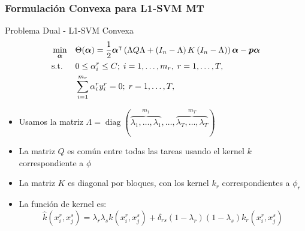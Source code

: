 \documentclass[aspectratio=43]{beamer}
\DeclareMathOperator{\Diag}{diag}
\newcommand{\upper}[1]{\expandafter\MakeUppercase\expandafter{#1}}
\newcommand{\mymat}[1]{\upper{#1}}
\newcommand{\myvec}[1]{\bm{#1}}
\newcommand{\fv}[1]{\myvec{#1}}
\newcommand{\fm}[1]{\mymat{#1}}
\newcommand{\nsamples}{n}
\newcommand{\ntasks}{T}
\newcommand{\npertask}{m}
\begin{document}
  \begin{frame}
      \frametitle{Formulación Convexa para L1-SVM MT}
  
      \begin{block}{Problema Dual - L1-SVM Convexa}
            \begin{equation}\nonumber
                  \begin{aligned}
                  & \min_{\fv{\alpha}} && \Theta(\fv{\alpha}) = \frac{1}{2} \fv{\alpha}^\intercal \left(\Lambda \fm{Q} \Lambda + \left(\fm{I}_{\nsamples} - \Lambda \right) \fm{K} \left(\fm{I}_{\nsamples} - \Lambda \right) \right) \fv{\alpha} - \fv{p} \fv{\alpha} \\
                  & \text{s.t.}
                  & & 0 \leq \alpha_i^r \leq C ; \; i=1, \ldots, \npertask_r,\; r=1, \ldots, \ntasks ,\\
                  & & & \sum_{i=1}^{m_r} \alpha_i^r y_i^r = 0;\;  r=1, \ldots, \ntasks , \\
                  \end{aligned}
              \end{equation}
      \end{block}
      \begin{itemize}
            \item Usamos la matriz $  \Lambda = \Diag(\overbrace{\lambda_1, \ldots, \lambda_1}^{\npertask_1}, \ldots, \overbrace{\lambda_\ntasks, \ldots, \lambda_\ntasks}^{\npertask_\ntasks}) $
            \item La matriz $Q$ es común entre todas las tareas usando el kernel $k$ correspondiente a $\phi$
            \item La matriz $K$ es diagonal por bloques, con los kernel $k_r$ correspondientes a $\phi_r$
            \item La función de kernel es: 
            $$     \widehat{k}({x}_i^r, {x}_j^s) = \lambda_r \lambda_s k({x}_i^r, {x}_j^s) +  \delta_{rs} (1-\lambda_r) (1 - \lambda_s) k_r({x}_i^r, {x}_j^s) 
            $$
      \end{itemize}

  \end{frame}
\end{document}
